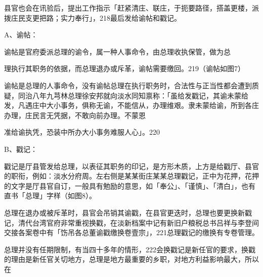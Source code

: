 \begin{BookQuote}
县官也会在讯验后，提出工作指示「赶紧清庄、联庄，于扼要路径，搭盖更楼，派拨庄民支更把路；实力奉行」，218最后发给谕帖和戳记。
\end{BookQuote}


A、谕帖：

\begin{BookQuote}
谕帖是官府委派总理的谕令，属一种人事命令，由总理收执保管，做为总
\end{BookQuote}

理执行其职务的依据，而总理退办或斥革，谕帖需要缴回。219（谕帖如图7）

\begin{BookQuote}
谕帖是总理的人事命令，没有谕帖总理在执行职务时，合法性与正当性都会遭到质疑，同治八年九芎林总理徐安邦就向淡水同知禀称：「虽给发戳记，其谕未蒙给发，凡遇庄中大小事务，俱称无谕，不能信从，办理维艰。隶未蒙给谕，所到各庄办理，庄民言无凭据，不敢向前办理。不蒙恩
\end{BookQuote}

准给谕执凭，恐装中所办大小事务难服人心」。220

B、戳记：

\begin{BookQuote}
戳记是厅县管发给总理，以表征其职务的印记，是方形木质，上方是给戳厅、县官的职衔，例如：淡水分府周。左右侧是某某街庄某某总理戳记，正中为花押，花押的文字是厅县官自订，一般具有勉励的意思，如「奉公」、「谨慎」、「清白」，也有直书「总理」字样（如图8）。
\end{BookQuote}

总理在退办或被斥革时，县官会吊销其谕戳，在县官更迭时，总理也要更换新戳记，清代台湾官府非常重视换戳，在淡新档案中记有新旧户粮税总书吕祥与李登间交接各案卷中有「饬吊各总董谕戳缴换卷壹宗」，221总理戳记的缴换有专卷管理。

总理并没有任期限制，有当四十多年的情形，222会换戳记是新任官的要求，换戳的理由是新任官关切地方，总理是地方最重要的乡职，对地方利益影响最大，所以在

\vfill
\begin{BookNotes}
\end{BookNotes}


